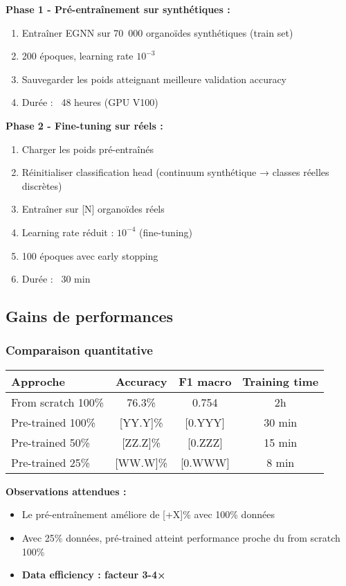 \textbf{Phase 1 - Pré-entraînement sur synthétiques :}
\begin{enumerate}
    \item Entraîner EGNN sur 70~000 organoïdes synthétiques (train set)
    \item 200 époques, learning rate $10^{-3}$
    \item Sauvegarder les poids atteignant meilleure validation accuracy
    \item Durée : ~48 heures (GPU V100)
\end{enumerate}

\textbf{Phase 2 - Fine-tuning sur réels :}
\begin{enumerate}
    \item Charger les poids pré-entraînés
    \item Réinitialiser classification head (continuum synthétique → classes réelles discrètes)
    \item Entraîner sur [N] organoïdes réels
    \item Learning rate réduit : $10^{-4}$ (fine-tuning)
    \item 100 époques avec early stopping
    \item Durée : ~30 min
\end{enumerate}

\subsection{Gains de performances}

\subsubsection{Comparaison quantitative}

\begin{center}
\begin{tabular}{|l|c|c|c|}
\hline
\textbf{Approche} & \textbf{Accuracy} & \textbf{F1 macro} & \textbf{Training time} \\
\hline
From scratch 100\% & 76.3\% & 0.754 & 2h \\
Pre-trained 100\% & [YY.Y]\% & [0.YYY] & 30 min \\
Pre-trained 50\% & [ZZ.Z]\% & [0.ZZZ] & 15 min \\
Pre-trained 25\% & [WW.W]\% & [0.WWW] & 8 min \\
\hline
\end{tabular}
\end{center}

\textbf{Observations attendues :}
\begin{itemize}
    \item Le pré-entraînement améliore de [+X]\% avec 100\% données
    \item Avec 25\% données, pré-trained atteint performance proche du from scratch 100\%
    \item \textbf{Data efficiency : facteur 3-4×}
\end{itemize}

